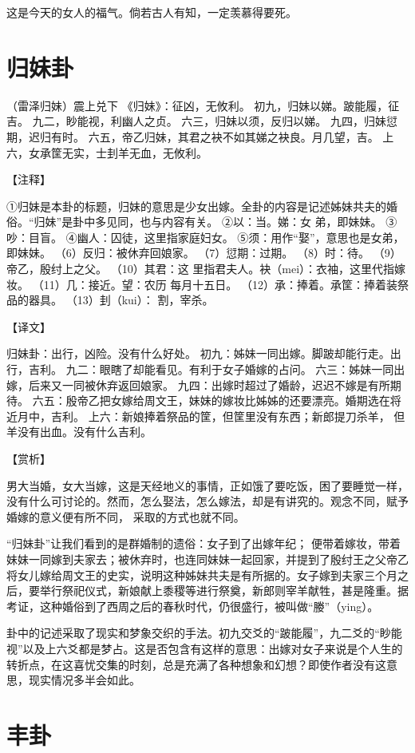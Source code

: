 \documentclass[12pt,UTF8]{ctexbook}
\begin{document}
这是今天的女人的福气。倘若古人有知，一定羡慕得要死。

\chapter{归妹卦}

（雷泽归妹）震上兑下
《归妹》：征凶，无攸利。
初九，归妹以娣。跛能履，征吉。
九二，眇能视，利幽人之贞。
六三，归妹以须，反归以娣。
九四，归妹愆期，迟归有时。
六五，帝乙归妹，其君之袂不如其娣之袂良。月几望，吉。
上六，女承筐无实，士刲羊无血，无攸利。

【注释】

①归妹是本卦的标题，归妹的意思是少女出嫁。全卦的内容是记述姊妹共夫的婚俗。“归妹”是卦中多见同，也与内容有关。
②以：当。娣：女 弟，即妹妹。
③吵：目盲。
④幽人：囚徒，这里指家庭妇女。
⑤须：用作“娶”，意思也是女弟，即妹妹。
（6）反归：被休弃回娘家。
（7）愆期：过期。
（8）时：待。
（9）帝乙，殷纣上之父。
（10）其君：这 里指君夫人。袂（mei）：衣袖，这里代指嫁妆。
（11）几：接近。望：农历 每月十五日。
（12）承：捧着。承筐：捧着装祭品的器具。
（13）刲（kui）： 割，宰杀。

【译文】

归妹卦：出行，凶险。没有什么好处。
初九：姊妹一同出嫁。脚跛却能行走。出行，吉利。
九二：眼瞎了却能看见。有利于女子婚嫁的占问。
六三：姊妹一同出嫁，后来又一同被休弃返回娘家。
九四：出嫁时超过了婚龄，迟迟不嫁是有所期待。
六五：殷帝乙把女嫁给周文王，妹妹的嫁妆比姊姊的还要漂亮。婚期选在将近月中，吉利。
上六：新娘捧着祭品的筐，但筐里没有东西；新郎提刀杀羊， 但羊没有出血。没有什么吉利。

【赏析】

男大当婚，女大当嫁，这是天经地义的事情，正如饿了要吃饭，困了要睡觉一样，没有什么可讨论的。然而，怎么娶法，怎么嫁法，却是有讲究的。观念不同，赋予婚嫁的意义便有所不同， 采取的方式也就不同。

“归妹卦”让我们看到的是群婚制的遗俗：女子到了出嫁年纪； 便带着嫁妆，带着妹妹一同嫁到夫家去；被休弃时，也连同妹妹一起回家，并提到了殷纣王之父帝乙将女儿嫁给周文王的史实，说明这种姊妹共夫是有所据的。女子嫁到夫家三个月之后，要举行祭祀仪式，新娘献上黍稷等进行祭奠，新郎则宰羊献牲，甚是隆重。据考证，这种婚俗到了西周之后的春秋时代，仍很盛行，被叫做“媵”（ying）。

卦中的记述采取了现实和梦象交织的手法。初九交爻的“跛能履”，九二爻的“眇能视”以及上六爻都是梦占。这是否包含有这样的意思：出嫁对女子来说是个人生的转折点，在这喜忧交集的时刻，总是充满了各种想象和幻想？即使作者没有这意思，现实情况多半会如此。

\chapter{丰卦}
\end{document}
